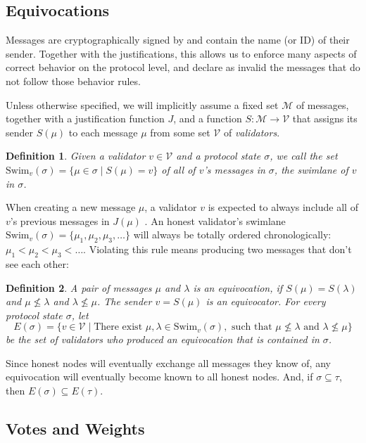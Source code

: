 \documentclass[12pt]{article}
\newtheorem{definition}{Definition}
\begin{document}
\subsection{Equivocations}

Messages are cryptographically signed by and contain the name (or ID) of their sender. Together with the justifications, this allows us to enforce many aspects of correct behavior on the protocol level, and declare as invalid the messages that do not follow those behavior rules.

Unless otherwise specified, we will implicitly assume a fixed set $\mathcal{M}$ of messages, together with a justification function $J$, and a function $S: \mathcal{M} \rightarrow \mathcal{V}$ that assigns its sender $S(\mu)$ to each message $\mu$ from some set $\mathcal{V}$ of \emph{validators}.

\begin{definition}
Given a validator $v \in \mathcal{V}$ and a protocol state $\sigma$, we call the set $\mathrm{Swim}_v(\sigma) = \{ \mu \in \sigma \mid S(\mu) = v \}$ of all of $v$'s messages in $\sigma$, the \emph{swimlane of $v$ in $\sigma$}.
\end{definition}

When creating a new message $\mu$, a validator $v$ is expected to always include all of $v$'s previous messages in $J(\mu)$ .  An honest validator's swimlane $\mathrm{Swim}_v(\sigma) = \{\mu_1, \mu_2, \mu_3, \ldots \}$ will always be totally ordered chronologically: $\mu_1 < \mu_2 < \mu_3 < \ldots$. Violating this rule means producing two messages that don't see each other:

\begin{definition}
A pair of messages $\mu$ and $\lambda$ is an \emph{equivocation}, if $S(\mu) = S(\lambda)$ and $\mu \not\leq \lambda$ and $\lambda \not\leq \mu$. The sender $v = S(\mu)$ is an \emph{equivocator}. For every protocol state $\sigma$, let
  $$E(\sigma) = \{v\in\mathcal{V} \mid \text{There exist } \mu, \lambda \in \mathrm{Swim}_v(\sigma), \text{ such that } \mu \not\leq \lambda \text{ and } \lambda \not\leq \mu\}$$
be the set of validators who produced an equivocation that is contained in $\sigma$.
\end{definition}

Since honest nodes will eventually exchange all messages they know of, any equivocation will eventually become known to all honest nodes. And, if $\sigma \subseteq \tau$, then $E(\sigma) \subseteq E(\tau)$.


\subsection{Votes and Weights}
\end{document}
